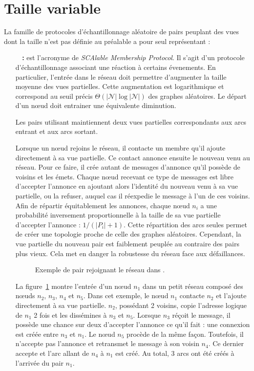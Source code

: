 

\section{Taille variable}
\label{net:sec:variable}

La famille de protocoles d'échantillonnage aléatoire de pairs peuplant des vues
dont la taille n'est pas définie au préalable a pour seul représentant :

\begin{itemize}
\item [\textbf{\SCAMP~\cite{ganesh2001scamp, ganesh2003peer} :}] est l'acronyme
  de \emph{SCAlable Membership Protocol}. Il s'agit d'un protocole
  d'échantillonnage associant une réaction à certains évenements. En
  particulier, l'entrée dans le réseau doit permettre d'augmenter la taille
  moyenne des vues partielles. Cette augmentation est logarithmique et
  correspond au seuil précis $\Theta (|\mathcal{N}|\log |\mathcal{N}|)$ des
  graphes aléatoires. Le départ d'un nœud doit entrainer une équivalente
  diminution.

  Les pairs utilisant \SCAMP maintiennent deux vues partielles correspondants
  aux arcs entrant et aux arcs sortant.

  Lorsque un nœud rejoins le réseau, il contacte un membre qu'il ajoute
  directement à sa vue partielle. Ce contact annonce ensuite le nouveau venu au
  réseau. Pour ce faire, il crée autant de messages d'annonce qu'il possède de
  voisins et les émets. Chaque nœud recevant ce type de messages est libre
  d'accepter l'annonce en ajoutant alors l'identité du nouveau venu à sa vue
  partielle, ou la refuser, auquel cas il réexpedie le message à l'un de ces
  voisins. Afin de répartir équitablement les annonces, chaque nœud $n_i$ a une
  probabilité inversement proportionnelle à la taille de sa vue partielle
  d'accepter l'annonce : $1/(|P_i|+1)$. Cette répartition des arcs seules permet
  de créer une topologie proche de celle des graphes aléatoires. Cependant, la
  vue partielle du nouveau pair est faiblement peuplée au contraire des pairs
  plus vieux. Cela met en danger la robustesse du réseau face aux défaillances.

  \begin{figure}
    \centering
    
    \caption{\label{net:fig:scampexample} Exemple de pair rejoignant le réseau
      dans \SCAMP.}
  \end{figure}

  La figure~\ref{net:fig:scampexample} montre l'entrée d'un nœud $n_1$ dans un
  petit réseau \SCAMP composé des nœuds $n_2$, $n_3$, $n_4$ et $n_5$. Dans cet
  exemple, le nœud $n_1$ contacte $n_2$ et l'ajoute directement à sa vue
  partielle. $n_2$, possédant 2 voisins, copie l'adresse logique de $n_1$ 2 fois
  et les dissémines à $n_3$ et $n_5$. Lorsque $n_3$ réçoit le message, il
  possède une chance sur deux d'accepter l'annonce ce qu'il fait : une connexion
  est créée entre $n_3$ et $n_1$. Le nœud $n_5$ procède de la même
  façon. Toutefois, il n'accepte pas l'annonce et retransmet le message à son
  voisin $n_4$. Ce dernier accepte et l'arc allant de $n_4$ à $n_1$ est créé. Au
  total, 3 arcs ont été créés à l'arrivée du pair $n_1$.



\end{itemize}
